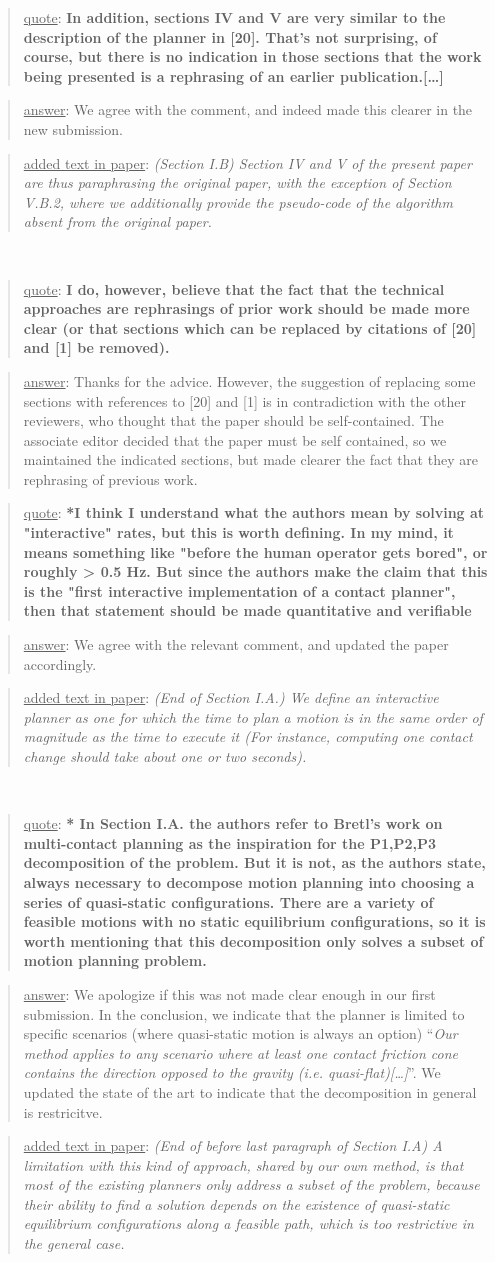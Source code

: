 \documentclass[a4paper]{article}
\newcommand{\done}[0]{}
\newcommand\quot[1]{\begin{quote} \underline{quote}: \textbf{#1}\end{quote}}
\newcommand\as[1]{\begin{quote} \underline{answer}: {#1}\end{quote} }
\newcommand\qt[1]{\begin{quote} \underline{added text in paper}: \textit{#1}\end{quote} \leavevmode \\ }
\begin{document}
\quot{In addition, sections IV and V are very similar to the description of
the planner in [20]. That's not surprising, of course, but there is no
indication in those sections that the work being presented is a
rephrasing of an earlier publication.[\dots] }
\as{We agree with the comment, and indeed made this clearer in the new submission.}
\qt{(Section I.B) Section IV and V of the present paper are thus paraphrasing the original paper, with the exception of Section V.B.2, where we additionally provide the pseudo-code of the algorithm absent from the original paper.}\done

\quot{I do, however,
believe that the fact that the technical approaches are rephrasings of
prior work should be made more clear (or that sections which can be
replaced by citations of [20] and [1] be removed).}
\as{Thanks for the advice. However, the suggestion of replacing some sections with references to [20] and [1] is in contradiction with the other reviewers, who thought that the paper should be self-contained.
The associate editor decided that the paper must be self contained, so we maintained the indicated sections, but made clearer the fact that they are rephrasing of previous work. }\done

\quot{*I think I understand what the authors mean by solving at
"interactive" rates, but this is worth defining. In my mind, it means
something like "before the human operator gets bored", or roughly > 0.5
Hz. But since the authors make the claim that this is the "first
interactive implementation of a contact planner", then that statement
should be made quantitative and verifiable}
\as{We agree with the relevant comment, and updated the paper accordingly.}
\qt{(End of Section I.A.) We define an interactive planner as one for which the time to plan a motion is in the same order of magnitude as the time to execute it (For instance, computing one contact change should take about one or two seconds).}\done

\quot{* In Section I.A. the authors refer to Bretl's work on multi-contact
planning as the inspiration for the P1,P2,P3 decomposition of the
problem. But it is not, as the authors state, always necessary to
decompose motion planning into choosing a series of quasi-static
configurations. There are a variety of feasible motions with no static
equilibrium configurations, so it is worth mentioning that this
decomposition only solves a subset of motion planning problem.}
\as{We apologize if this was not made clear enough in our first submission. In the conclusion, we indicate that the planner is limited to specific scenarios (where quasi-static motion
is always an option) ``\textit{Our method applies to any scenario where at least one
contact friction cone contains the direction opposed to the
gravity (i.e. quasi-flat)[\dots]}''. We updated the state of the art to indicate that the decomposition in general is restricitve.}
\qt{(End of before last paragraph of Section I.A) A limitation with
this kind of approach, shared by our own method, is that most of the existing planners only address a subset of the problem, because their ability to find a solution depends
on the existence of quasi-static equilibrium configurations along a feasible path, which is too restrictive in the general case.}\done
\end{document}
